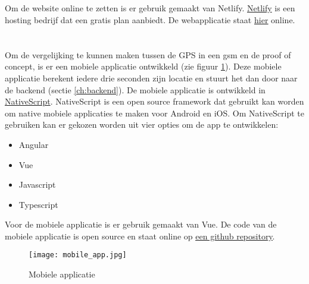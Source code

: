\subsection{}
Om de website online te zetten is er gebruik gemaakt van Netlify. \href{https://www.netlify.com/}{Netlify} is een hosting bedrijf dat een gratis plan aanbiedt. De webapplicatie staat \href{https://indy-bap-frontend.netlify.com/}{\underline{hier}} online.

\section{}
\label{ch:mobileapp}
Om de vergelijking te kunnen maken tussen de GPS in een gsm en de proof of concept, is er een mobiele applicatie ontwikkeld (zie figuur \ref{fig:mobileapp}). Deze mobiele applicatie berekent iedere drie seconden zijn locatie en stuurt het dan door naar de backend (sectie \ref{ch:backend}). De mobiele applicatie is ontwikkeld in \href{https://www.nativescript.org/}{NativeScript}. NativeScript is een open source framework dat gebruikt kan worden om native mobiele applicaties te maken voor Android en iOS. Om NativeScript te gebruiken kan er gekozen worden uit vier opties om de app te ontwikkelen:
\begin{itemize}
	\item Angular
	\item Vue
	\item Javascript
	\item Typescript
\end{itemize}
Voor de mobiele applicatie is er gebruik gemaakt van Vue. De code van de mobiele applicatie is open source en staat online op \underline{\href{https://github.com/IndyVC/bap-gsmtracker}{een github repository}}. 
\begin{figure}
	\texttt{[image: mobile\_app.jpg]}
	\caption{Mobiele applicatie}
	\label{fig:mobileapp}
\end{figure}